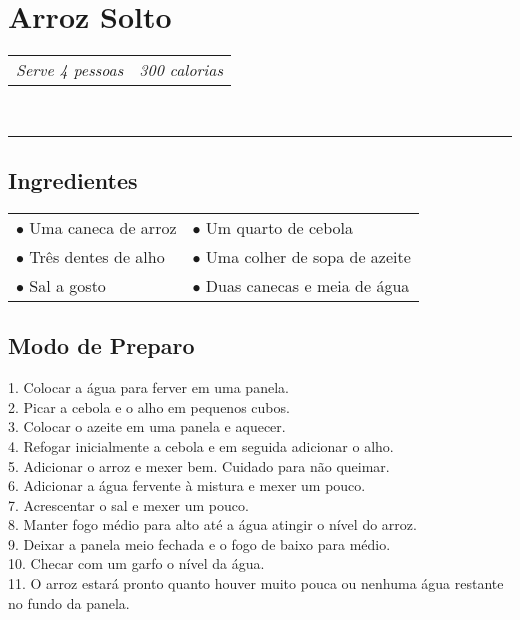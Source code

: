 \newpage
\noindent
{}
\vspace*{0.335\paperheight}
\section*{\sectionformat Arroz Solto}
\vspace*{-0.1cm}
\begin{aemulticol}[width=0.495\textwidth,height=0.545\textheight]
	\begin{tabu} to 0.5\linewidth {X[l]X[r]}
	   \textit{Serve 4 pessoas} & \textit{300 calorias}
	\end{tabu}\\
	\rule[0.5ex]{0.5\linewidth}{1pt}	
	\vspace*{-0.7cm}
	\subsection*{\subsectionformat Ingredientes}
	\vspace*{-0.15cm}
	\begin{tabu} to 0.5\linewidth {X[l]X[l]}
		$\bullet$ Uma caneca de arroz & $\bullet$ Um quarto de cebola\\$\bullet$ Três dentes de alho & $\bullet$ Uma colher de sopa de azeite\\$\bullet$ Sal a gosto & $\bullet$ Duas canecas e meia de água
		
	\end{tabu}
	\vspace*{-0.15cm}
	\subsection*{\subsectionformat Modo de Preparo}
	\vspace*{-0.15cm}
	1. Colocar a água para ferver em uma panela.\\
2. Picar a cebola e o alho em pequenos cubos.\\
3. Colocar o azeite em uma panela e aquecer.\\
4. Refogar inicialmente a cebola e em seguida adicionar o alho.\\
5. Adicionar o arroz e mexer bem. Cuidado para não queimar.\\
6. Adicionar a água fervente à mistura e mexer um pouco.\\
7. Acrescentar o sal e mexer um pouco.\\
8. Manter fogo médio para alto até a água atingir o nível do arroz.\\
9. Deixar a panela meio fechada e o fogo de baixo para médio.\\
10. Checar com um garfo o nível da água.\\
11. O arroz estará pronto quanto houver muito pouca ou nenhuma água restante no fundo da panela.


\end{aemulticol}
